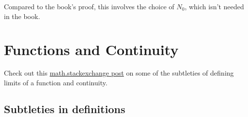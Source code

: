 \documentclass{article}
\begin{document}
Compared to the book's proof, this involves the choice of $N_0$, which isn't needed in the book.


\section{Functions and Continuity}
Check out this \href{https://math.stackexchange.com/questions/455296/can-a-function-with-just-one-point-in-its-domain-be-continuous}{math.stackexchange post} on some of the subtleties of defining limits of a function and continuity. 


\subsection{Subtleties in definitions}
\end{document}
